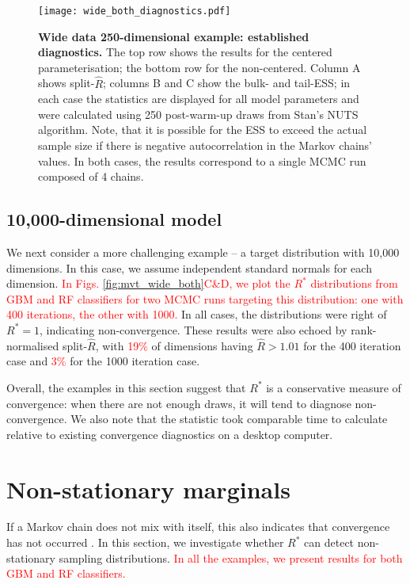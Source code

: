 \documentclass{article}
\begin{document}
\begin{figure}[!htb]
	\centerline{\texttt{[image: wide\_both\_diagnostics.pdf]}}
	\caption{\textbf{Wide data 250-dimensional example: established diagnostics.} The top row shows the results for the centered parameterisation; the bottom row for the non-centered. Column A shows split-$\widehat{R}$; columns B and C show the bulk- and tail-ESS; in each case the statistics are displayed for all model parameters and were calculated using 250 post-warm-up draws from Stan's NUTS algorithm. Note, that it is possible for the ESS to exceed the actual sample size if there is negative autocorrelation in the Markov chains' values. In both cases, the results correspond to a single MCMC run composed of 4 chains.}
	\label{fig:wide_both_diagnostics}
\end{figure}

\subsection{10,000-dimensional model}
We next consider a more challenging example -- a target distribution with 10,000 dimensions. In this case, we assume independent standard normals for each dimension. \textcolor{red}{In Figs. \ref{fig:mvt_wide_both}C\&D, we plot the $R^*$ distributions from GBM and RF classifiers for two MCMC runs targeting this distribution: one with 400 iterations, the other with 1000.} In all cases, the distributions were right of $R^*=1$, indicating non-convergence. These results were also echoed by rank-normalised split-$\widehat{R}$, with \textcolor{red}{19\%} of dimensions having $\widehat{R}>1.01$ for the 400 iteration case and \textcolor{red}{3\%} for the 1000 iteration case.

Overall, the examples in this section suggest that $R^*$ is a conservative measure of convergence: when there are not enough draws, it will tend to diagnose non-convergence. We also note that the statistic took comparable time to calculate relative to existing convergence diagnostics on a desktop computer.

\section{Non-stationary marginals}\label{sec:non-stationary}
If a Markov chain does not mix with itself, this also indicates that convergence has not occurred \citep{gelman2013bayesian}. In this section, we investigate whether $R^*$ can detect non-stationary sampling distributions. \textcolor{red}{In all the examples, we present results for both GBM and RF classifiers.}
\end{document}
